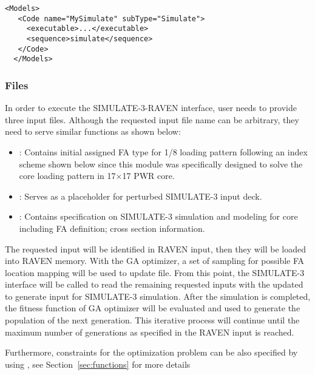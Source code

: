 \begin{lstlisting}[style=XML]
  <Models>
   <Code name="MySimulate" subType="Simulate">
     <executable>...</executable>
     <sequence>simulate</sequence>
   </Code>
  </Models>
  \end{lstlisting}

\subsubsection{Files}
In order to execute the SIMULATE-3-RAVEN interface, user needs to provide three input files. 
Although the requested input file name can be arbitrary, they need to serve similar functions as shown below:
\begin{itemize}
	\item {}: Contains initial assigned FA type for 1/8 loading pattern following an index scheme shown below since this module was specifically designed to solve the core loading pattern in 17$\times$17 PWR core. 
	\item {}: Serves as a placeholder for perturbed SIMULATE-3 input deck.
	\item {}: Contains specification on SIMULATE-3 simulation and modeling for core including FA definition; cross section information.
\end{itemize}
The requested input will be identified in RAVEN input, then they will be loaded into RAVEN memory.
With the GA optimizer, a set of sampling for possible FA location mapping 
will be used to update  file. From this point, the SIMULATE-3 interface will be called to
read the remaining requested inputs with the updated  to generate input 
for SIMULATE-3 simulation. After the simulation is completed, the fitness function of GA 
optimizer will be evaluated and used to generate the population of the next generation. 
This iterative process will continue until the maximum number of generations as specified 
in the RAVEN input is reached.

Furthermore, constraints for the optimization problem can be also specified by using  
, see Section~\ref{sec:functions} for more details

